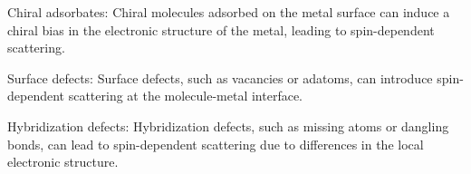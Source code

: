 \documentclass{article}
\begin{document}
\begin{itemize}
	Chiral adsorbates: Chiral molecules adsorbed on the metal surface can induce a chiral bias in the electronic structure of the metal, leading to spin-dependent scattering.
	
	Surface defects: Surface defects, such as vacancies or adatoms, can introduce spin-dependent scattering at the molecule-metal interface.
	
	Hybridization defects: Hybridization defects, such as missing atoms or dangling bonds, can lead to spin-dependent scattering due to differences in the local electronic structure.  
\end{itemize}
\end{document}
